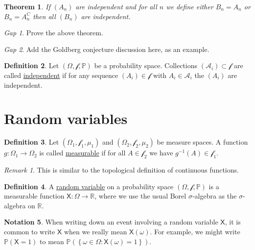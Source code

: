 \documentclass[11pt]{article}
\newcommand{\col}[1]{\mathscr{#1}}
\newcommand{\rv}[1]{\mathsf{#1}}
\newcommand{\p}{\mathbb{P}}
\newcommand{\defname}[1]{\underline{#1}}
\newcommand{\RR}{\mathbb{R}}
\theoremstyle{theorem}
\newtheorem{theorem}{Theorem}[section]
\theoremstyle{definition}
\newtheorem{definition}[theorem]{Definition}
\newtheorem{notation}[theorem]{Notation}
\theoremstyle{remark}
\newtheorem*{remark}{Remark}
\theoremstyle{step}
\theoremstyle{gap}
\newtheorem*{gap}{Gap}
\begin{document}
\begin{theorem}
If \((A_n)\) are independent and for all \(n\) we define either \(B_n = A_n\) or \(B_n = A_n^C\) then all \((B_n)\) are independent.
\end{theorem}

\begin{gap}
Prove the above theorem.
\end{gap}

\begin{gap}
Add the Goldberg conjecture discussion here, as an example.
\end{gap}

\begin{definition}
Let \((\Omega, \col{f}, \p)\) be a probability space. Collections \((\col{A}_i) \subset \col{f}\) are called \defname{independent} if for any sequence \((A_i)\in\col{f}\) with \(A_i \in \col{A}_i\) the \((A_i)\) are independent.
\end{definition}

\section{Random variables}

\begin{definition}
Let \((\Omega_1, \col{f}_1, \mu_1)\) and \((\Omega_2, \col{f}_2, \mu_2)\) be measure spaces. A function \(g: \Omega_1 \to \Omega_2\) is called \defname{measurable} if for all \(A \in \col{f}_2\) we have \(g^{-1}(A) \in \col{f}_1\).
\end{definition}

\begin{remark}
This is similar to the topological definition of continuous functions.
\end{remark}


\begin{definition}
A \defname{random variable} on a probability space \((\Omega, \col{f}, \p)\) is a measurable function \(\rv{X}:\Omega \to \RR\), where we use the usual Borel \(\sigma\)-algebra as the \(\sigma\)-algebra on \(\RR\).
\end{definition}

\begin{notation}
When writing down an event involving a random variable \(\rv{X}\), it is common to write \(\rv{X}\) when we really mean \(\rv{X}(\omega)\). For example, we might write \(\p(\rv{X} = 1)\) to mean \(\p\left(\left\{\omega \in \Omega : \rv{X}(\omega) = 1\right\}\right)\).
\end{notation}
\end{document}
